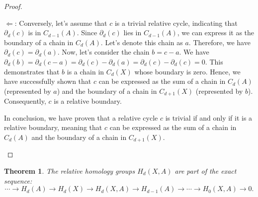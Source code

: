 \documentclass{amsart}
\newtheorem{theorem}[section]{Theorem}
\begin{document}
\begin{proof}
\begin{enumerate}
	\glqq $\Leftarrow$\grqq{}: Conversely, let's assume that $c$ is a trivial relative cycle, indicating that $\partial_d(c)$ is in $C_{d-1}(A)$. Since $\partial_d(c)$ lies in $C_{d-1}(A)$, we can express it as the boundary of a chain in $C_d(A)$. Let's denote this chain as $a$. Therefore, we have $\partial_d(c) = \partial_d(a)$. Now, let's consider the chain $b = c - a$. We have $\partial_d(b) = \partial_d(c - a) = \partial_d(c) - \partial_d(a) = \partial_d(c) - \partial_d(c) = 0$. This demonstrates that $b$ is a chain in $C_d(X)$ whose boundary is zero. Hence, we have successfully shown that $c$ can be expressed as the sum of a chain in $C_d(A)$ (represented by $a$) and the boundary of a chain in $C_{d+1}(X)$ (represented by $b$). Consequently, $c$ is a relative boundary.

	In conclusion, we have proven that a relative cycle $c$ is trivial if and only if it is a relative boundary, meaning that $c$ can be expressed as the sum of a chain in $C_d(A)$ and the boundary of a chain in $C_{d+1}(X)$.
\end{enumerate}
\end{proof}

\begin{theorem}
The relative homology groups $H_d(X,A)$ are part of the exact sequence:
\begin{equation*}
\cdots \rightarrow H_d(A) \rightarrow H_d(X) \rightarrow H_d(X,A) \rightarrow H_{d-1}(A) \rightarrow \cdots \rightarrow H_0(X,A) \rightarrow 0.
\end{equation*}
\end{theorem}
\end{document}
